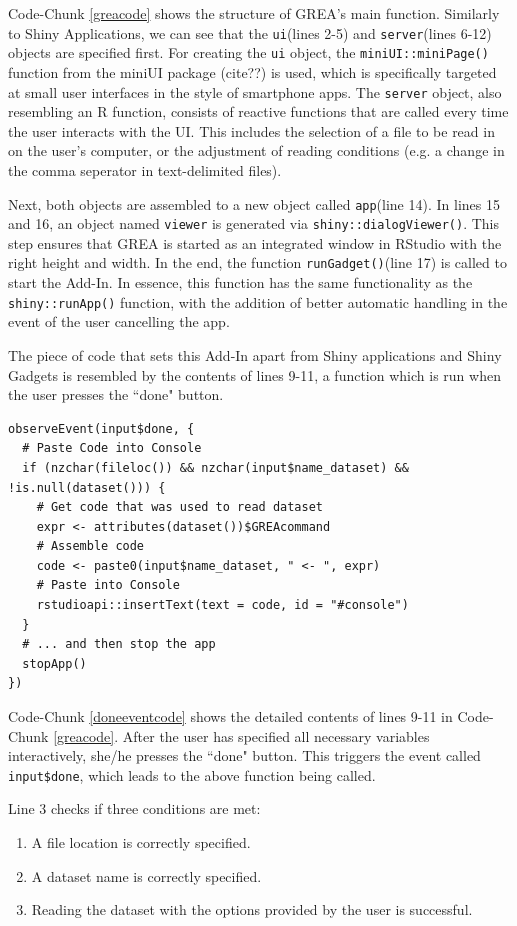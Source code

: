 \documentclass[12pt]{article} %
\newcommand{\li}{\lstinline}
\begin{document}
Code-Chunk \ref{greacode} shows the structure of GREA's main function. Similarly to Shiny Applications, we can see that the \li{ui}(lines 2-5) and \li{server}(lines 6-12) objects are specified first. For creating the \li{ui} object, the \li{miniUI::miniPage()} function from the miniUI package (cite??) is used, which is specifically targeted at small user interfaces in the style of smartphone apps. The \li{server} object, also resembling an R function, consists of reactive functions that are called every time the user interacts with the UI. This includes the selection of a file to be read in on the user's computer, or the adjustment of reading conditions (e.g. a change in the comma seperator in text-delimited files).

Next, both objects are assembled to a new object called \li{app}(line 14). In lines 15 and 16, an object named \li{viewer} is generated via \li{shiny::dialogViewer()}. This step ensures that GREA is started as an integrated window in RStudio with the right height and width. In the end, the function \li{runGadget()}(line 17) is called to start the Add-In. In essence, this function has the same functionality as the \li{shiny::runApp()} function, with the addition of better automatic handling in the event of the user cancelling the app.

The piece of code that sets this Add-In apart from Shiny applications and Shiny Gadgets is resembled by the contents of lines 9-11, a function which is run when the user presses the ``done" button.

\begin{lstlisting}[caption = Contents of reactive function for ``Done"-event, label = doneeventcode]
observeEvent(input$done, {
  # Paste Code into Console
  if (nzchar(fileloc()) && nzchar(input$name_dataset) && !is.null(dataset())) {
    # Get code that was used to read dataset
    expr <- attributes(dataset())$GREAcommand
    # Assemble code
    code <- paste0(input$name_dataset, " <- ", expr)
    # Paste into Console
    rstudioapi::insertText(text = code, id = "#console")
  }
  # ... and then stop the app
  stopApp()
})
\end{lstlisting}

Code-Chunk \ref{doneeventcode} shows the detailed contents of lines 9-11 in Code-Chunk \ref{greacode}. After the user has specified all necessary variables interactively, she/he presses the ``done" button. This triggers the event called \li{input$done}, which leads to the above function being called.

Line 3 checks if three conditions are met: 
\begin{enumerate}
\item A file location is correctly specified.
\item A dataset name is correctly specified.
\item Reading the dataset with the options provided by the user is successful.
\end{enumerate}
\end{document}
